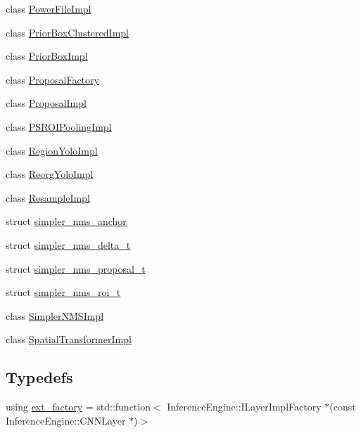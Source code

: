 \begin{DoxyCompactItemize}
class \hyperlink{classInferenceEngine_1_1Extensions_1_1Cpu_1_1PowerFileImpl}{Power\+File\+Impl}
\item 
class \hyperlink{classInferenceEngine_1_1Extensions_1_1Cpu_1_1PriorBoxClusteredImpl}{Prior\+Box\+Clustered\+Impl}
\item 
class \hyperlink{classInferenceEngine_1_1Extensions_1_1Cpu_1_1PriorBoxImpl}{Prior\+Box\+Impl}
\item 
class \hyperlink{classInferenceEngine_1_1Extensions_1_1Cpu_1_1ProposalFactory}{Proposal\+Factory}
\item 
class \hyperlink{classInferenceEngine_1_1Extensions_1_1Cpu_1_1ProposalImpl}{Proposal\+Impl}
\item 
class \hyperlink{classInferenceEngine_1_1Extensions_1_1Cpu_1_1PSROIPoolingImpl}{P\+S\+R\+O\+I\+Pooling\+Impl}
\item 
class \hyperlink{classInferenceEngine_1_1Extensions_1_1Cpu_1_1RegionYoloImpl}{Region\+Yolo\+Impl}
\item 
class \hyperlink{classInferenceEngine_1_1Extensions_1_1Cpu_1_1ReorgYoloImpl}{Reorg\+Yolo\+Impl}
\item 
class \hyperlink{classInferenceEngine_1_1Extensions_1_1Cpu_1_1ResampleImpl}{Resample\+Impl}
\item 
struct \hyperlink{structInferenceEngine_1_1Extensions_1_1Cpu_1_1simpler__nms__anchor}{simpler\+\_\+nms\+\_\+anchor}
\item 
struct \hyperlink{structInferenceEngine_1_1Extensions_1_1Cpu_1_1simpler__nms__delta__t}{simpler\+\_\+nms\+\_\+delta\+\_\+t}
\item 
struct \hyperlink{structInferenceEngine_1_1Extensions_1_1Cpu_1_1simpler__nms__proposal__t}{simpler\+\_\+nms\+\_\+proposal\+\_\+t}
\item 
struct \hyperlink{structInferenceEngine_1_1Extensions_1_1Cpu_1_1simpler__nms__roi__t}{simpler\+\_\+nms\+\_\+roi\+\_\+t}
\item 
class \hyperlink{classInferenceEngine_1_1Extensions_1_1Cpu_1_1SimplerNMSImpl}{Simpler\+N\+M\+S\+Impl}
\item 
class \hyperlink{classInferenceEngine_1_1Extensions_1_1Cpu_1_1SpatialTransformerImpl}{Spatial\+Transformer\+Impl}
\end{DoxyCompactItemize}
\subsection*{Typedefs}
\begin{DoxyCompactItemize}
\item 
using \hyperlink{namespaceInferenceEngine_1_1Extensions_1_1Cpu_af4abba10662fceb8a076b617209801ed}{ext\+\_\+factory} = std\+::function$<$ Inference\+Engine\+::\+I\+Layer\+Impl\+Factory $\ast$(const Inference\+Engine\+::\+C\+N\+N\+Layer $\ast$)$>$
\end{DoxyCompactItemize}
